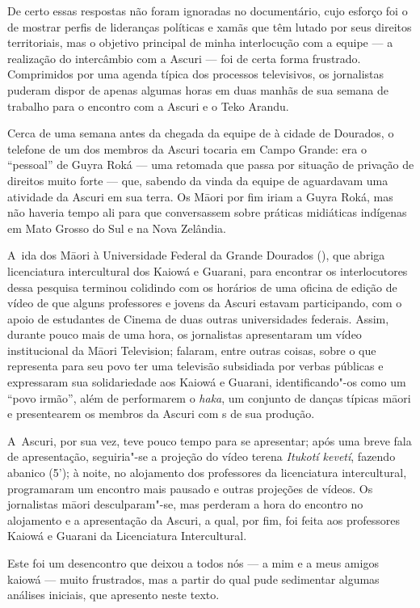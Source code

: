 De certo essas respostas não foram ignoradas no documentário, cujo
esforço foi o de mostrar perfis de lideranças políticas e xamãs que têm
lutado por seus direitos territoriais, mas o objetivo principal de
minha interlocução com a equipe --- a realização do intercâmbio com a
Ascuri --- foi de certa forma frustrado. Comprimidos por uma agenda
típica dos processos televisivos, os jornalistas puderam dispor de
apenas algumas horas em duas manhãs de sua semana de trabalho para o
encontro com a Ascuri e o Teko Arandu.

Cerca de uma semana antes da chegada da equipe de  à cidade de
Dourados, o telefone de um dos membros da Ascuri tocaria em Campo
Grande: era o ``pessoal'' de Guyra Roká --- uma retomada que passa por
situação de privação de direitos muito forte --- que, sabendo da vinda da
equipe de  aguardavam uma atividade da Ascuri em sua terra. Os
M\=aori por fim iriam a Guyra Roká, mas não haveria tempo ali para que
conversassem sobre práticas midiáticas indígenas em Mato Grosso do Sul
e na Nova Zelândia. 

A~ida dos M\=aori à Universidade Federal da Grande Dourados (), que
abriga licenciatura intercultural dos Kaiowá e Guarani, para encontrar
os interlocutores dessa pesquisa terminou colidindo com os horários de
uma oficina de edição de vídeo de que alguns professores e jovens da
Ascuri estavam participando, com o apoio de estudantes de Cinema de
duas outras universidades federais. Assim, durante pouco mais de uma
hora, os jornalistas apresentaram um vídeo institucional da M\=aori
Television; falaram, entre outras coisas, sobre o que representa para
seu povo ter uma televisão subsidiada por verbas públicas e expressaram
sua solidariedade aos Kaiowá e Guarani, identificando"-os como um ``povo
irmão'', além de performarem o \emph{haka}, um conjunto de danças típicas
m\=aori e presentearem os membros da Ascuri com s de sua produção. 

A~Ascuri, por sua vez, teve pouco tempo para se apresentar; após uma
breve fala de apresentação, seguiria"-se a projeção do vídeo terena
\emph{Itukotí kevetí}, fazendo abanico (5’); à noite, no alojamento dos
professores da licenciatura intercultural, programaram um encontro mais
pausado e outras projeções de vídeos. Os jornalistas m\=aori
desculparam"-se, mas perderam a hora do encontro no alojamento e a
apresentação da Ascuri, a qual, por fim, foi feita aos professores
Kaiowá e Guarani da Licenciatura Intercultural. 

Este foi um desencontro que deixou a todos nós --- a mim e a meus amigos
kaiowá --- muito frustrados, mas a partir do qual pude sedimentar algumas
análises iniciais, que apresento neste texto. 

